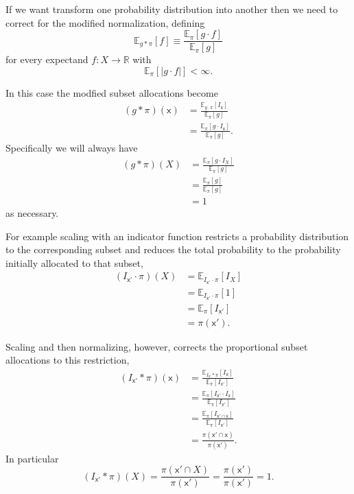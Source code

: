 \documentclass[
  letterpaper,
  DIV=11,
  numbers=noendperiod]{scrartcl}
\begin{document}
If we want transform one probability distribution into another then we
need to correct for the modified normalization, defining \[
\mathbb{E}_{g \ast \pi} [ f ] \equiv
\frac{ \mathbb{E}_{\pi} [ g \cdot f ] }{ \mathbb{E}_{\pi} [ g ] }
\] for every expectand \(f: X \rightarrow \mathbb{R}\) with \[
\mathbb{E}_{\pi} [ | g \cdot f | ] < \infty.
\]

In this case the modfied subset allocations become \begin{align*}
(g \ast \pi)(\mathsf{x})
&=
\frac{ \mathbb{E}_{g \cdot \pi} [ I_{\mathsf{x}} ] }
{ \mathbb{E}_{\pi} [ g ] }
\\
&=
\frac{ \mathbb{E}_{\pi} [ g \cdot I_{\mathsf{x}} ] }
{ \mathbb{E}_{\pi} [ g ] }.
\end{align*} Specifically we will always have \begin{align*}
(g \ast \pi)(X)
&=
\frac{ \mathbb{E}_{\pi} [ g \cdot I_{X} ] }
{ \mathbb{E}_{\pi} [ g ] }
\\
&=
\frac{ \mathbb{E}_{\pi} [ g ] }
{ \mathbb{E}_{\pi} [ g ] }
\\
&=
1
\end{align*} as necessary.

For example scaling with an indicator function restricts a probability
distribution to the corresponding subset and reduces the total
probability to the probability initially allocated to that subset,
\begin{align*}
(I_{\mathsf{x}'} \cdot \pi)(X)
&=
\mathbb{E}_{I_{\mathsf{x}'} \cdot \pi} [ I_{X} ]
\\
&=
\mathbb{E}_{I_{\mathsf{x}'} \cdot \pi} [ 1 ]
\\
&=
\mathbb{E}_{\pi} [ I_{\mathsf{x}'} ]
\\
&=
\pi(\mathsf{x}').
\end{align*}

Scaling and then normalizing, however, corrects the proportional subset
allocations to this restriction, \begin{align*}
(I_{\mathsf{x}'} \ast \pi)( \mathsf{x} )
&=
\frac{ \mathbb{E}_{I_{\mathsf{x}'} \ast \pi} [ I_{\mathsf{x}} ] }
{ \mathbb{E}_{\pi} [ I_{\mathsf{x}'} ] }
\\
&=
\frac{ \mathbb{E}_{\pi} [ I_{\mathsf{x}'} \cdot I_{\mathsf{x}} ] }
{ \mathbb{E}_{\pi} [ I_{\mathsf{x}'} ] }
\\
&=
\frac{ \mathbb{E}_{\pi} [ I_{\mathsf{x}' \cap \mathsf{x}} ] }
{ \mathbb{E}_{\pi} [ I_{\mathsf{x}'} ] }
\\
&=
\frac{ \pi(\mathsf{x}' \cap \mathsf{x}) }
{ \pi(\mathsf{x}') }.
\end{align*} In particular \[
(I_{\mathsf{x}'} \ast \pi)( X )
=
\frac{ \pi(\mathsf{x}' \cap X) }{ \pi(\mathsf{x}') }
=
\frac{ \pi(\mathsf{x}') }{ \pi(\mathsf{x}') }
=
1.
\]
\end{document}
